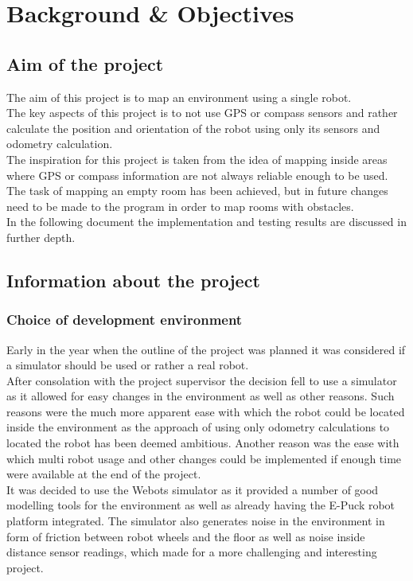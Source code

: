 \chapter{Background \& Objectives}
\label{Background}
\section{Aim of the project}
\label{aim}
The aim of this project is to map an environment using a single robot. \\
The key aspects of this project is to not use GPS or compass sensors and rather calculate the position and orientation of the robot using only its sensors and odometry calculation. \\
The inspiration for this project is taken from the idea of mapping inside areas where GPS or compass information are not always reliable enough to be used. \\[3ex]

The task of mapping an empty room has been achieved, but in future changes need to be made to the program in order to map rooms with obstacles.\\
In the following document the implementation and testing results are discussed in further depth.

\section{Information about the project}
\subsection{Choice of development environment}
Early in the year when the outline of the project was planned it was considered if a simulator should be used or rather a real robot.\\
After consolation with the project supervisor the decision fell to use a simulator as it allowed for easy changes in the environment as well as other reasons. Such reasons were the much more apparent ease with which the robot could be located inside the environment as the approach of using only odometry calculations to located the robot has been deemed ambitious. Another reason was the ease with which multi robot usage and other changes could be implemented if enough time were available at the end of the project.\\
It was decided to use the Webots\textsuperscript{\texttrademark} simulator as it provided a number of good modelling tools for the environment as well as already having the E-Puck robot platform integrated. The simulator also generates noise in the environment in form of friction between robot wheels and the floor as well as noise inside distance sensor readings, which made for a more challenging and interesting project.

